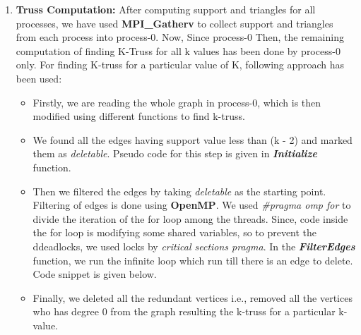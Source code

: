 \documentclass[12pt,a4paper]{article}
\begin{document}
\begin{enumerate}
    \newpage
    \item \textbf{Truss Computation: }After computing support and triangles for all processes, we have used \textbf{MPI\_Gatherv} to collect support and triangles from each process into process-0. Now, Since process-0 Then, the remaining computation of finding K-Truss for all k values has been done by process-0 only. For finding K-truss for a particular value of K, following approach has been used:

        \begin{itemize}
            \item Firstly, we are reading the whole graph in process-0, which is then modified using different functions to find k-truss.
            
            \item We found all the edges having support value less than (k - 2) and marked them as \textit{deletable}. Pseudo code for this step is given in \textit{\textbf{Initialize}} function.
            
            \item Then we filtered the edges by taking \textit{deletable} as the starting point. Filtering of edges is done using \textbf{OpenMP}. We used \textit{\#pragma omp for} to divide the iteration of the for loop among the threads. Since, code inside the for  loop is modifying some shared variables, so to prevent the ddeadlocks, we used locks by \textit{critical sections pragma}. In the \textit{\textbf{FilterEdges}} function, we run the infinite loop which run till there is an edge to delete. Code snippet is given below.
            
            \item Finally, we deleted all the redundant vertices i.e., removed all the vertices who has degree 0 from the graph resulting the k-truss for a particular k-value.
        \end{itemize}
\end{enumerate}
\end{document}
